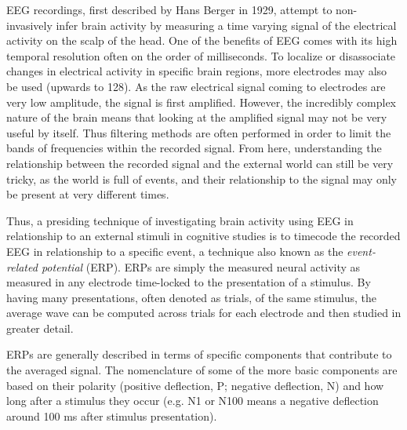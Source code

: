 \documentclass[a4paper,10pt,final]{ThesisStyle}
\begin{document}
EEG recordings, first described by Hans Berger in 1929, attempt to non-invasively infer brain activity by measuring a time varying signal of the electrical activity on the scalp of the head.  One of the benefits of EEG comes with its high temporal resolution often on the order of milliseconds.  To localize or disassociate changes in electrical activity in specific brain regions, more electrodes may also be used (upwards to 128).  As the raw electrical signal coming to electrodes are very low amplitude, the signal is first amplified.  However, the incredibly complex nature of the brain means that looking at the amplified signal may not be very useful by itself.  Thus filtering methods are often performed in order to limit the bands of frequencies within the recorded signal.  From here, understanding the relationship between the recorded signal and the external world can still be very tricky, as the world is full of events, and their relationship to the signal may only be present at very different times.  

Thus, a presiding technique of investigating brain activity using EEG in relationship to an external stimuli in cognitive studies is to timecode the recorded EEG in relationship to a specific event, a technique also known as the \textit{event-related potential} (ERP).  ERPs are simply the measured neural activity as measured in any electrode time-locked to the presentation of a stimulus.  By having many presentations, often denoted as trials, of the same stimulus, the average wave can be computed across trials for each electrode and then studied in greater detail.  

ERPs are generally described in terms of specific components that contribute to the averaged signal.  The nomenclature of some of the more basic components are based on their polarity (positive deflection, P; negative deflection, N) and how long after a stimulus they occur (e.g. N1 or N100 means a negative deflection around 100 ms after stimulus presentation).  
\end{document}
